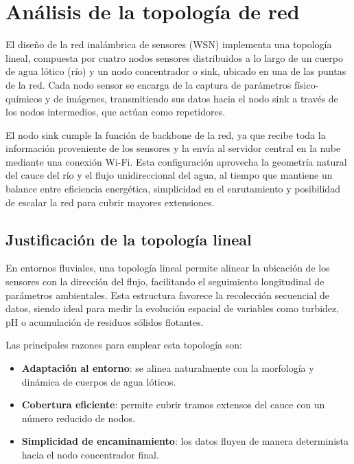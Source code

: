 \section{Análisis de la topología de red}

El diseño de la red inalámbrica de sensores (WSN) implementa una topología lineal, compuesta por cuatro nodos sensores distribuidos a lo largo de un cuerpo de agua lótico (río) y un nodo concentrador o sink, ubicado en una de las puntas de la red. Cada nodo sensor se encarga de la captura de parámetros físico-químicos y de imágenes, transmitiendo sus datos hacia el nodo sink a través de los nodos intermedios, que actúan como repetidores. 

El nodo sink cumple la función de backbone de la red, ya que recibe toda la información proveniente de los sensores y la envía al servidor central en la nube mediante una conexión Wi-Fi. Esta configuración aprovecha la geometría natural del cauce del río y el flujo unidireccional del agua, al tiempo que mantiene un balance entre eficiencia energética, simplicidad en el enrutamiento y posibilidad de escalar la red para cubrir mayores extensiones.

\subsection*{Justificación de la topología lineal}

En entornos fluviales, una topología lineal permite alinear la ubicación de los sensores con la dirección del flujo, facilitando el seguimiento longitudinal de parámetros ambientales. Esta estructura favorece la recolección secuencial de datos, siendo ideal para medir la evolución espacial de variables como turbidez, pH o acumulación de residuos sólidos flotantes.

Las principales razones para emplear esta topología son:

\begin{itemize}
    \item \textbf{Adaptación al entorno}: se alinea naturalmente con la morfología y dinámica de cuerpos de agua lóticos.
    \item \textbf{Cobertura eficiente}: permite cubrir tramos extensos del cauce con un número reducido de nodos.
    \item \textbf{Simplicidad de encaminamiento}: los datos fluyen de manera determinista hacia el nodo concentrador final.
\end{itemize}


